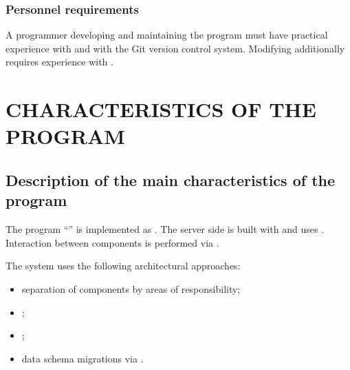 \documentclass[12pt,a4paper]{extarticle}
\begin{document}
\subsubsection{Personnel requirements}

\begin{hseExample}
A programmer developing and maintaining the program must have practical experience with  and with the Git version control system. Modifying  additionally requires experience with .
\end{hseExample}

\clearpage

\section{CHARACTERISTICS OF THE PROGRAM}

\subsection{Description of the main characteristics of the program}

\begin{hseExample}
The program \enquote{\projectname} is implemented as . The server side is built with  and uses . Interaction between components is performed via .

The system uses the following architectural approaches:

\begin{itemize}[leftmargin=1.25cm]
    \item separation of components by areas of responsibility;
    \item {};
    \item {};
    \item data schema migrations via .
\end{itemize}
\end{hseExample}
\end{document}
